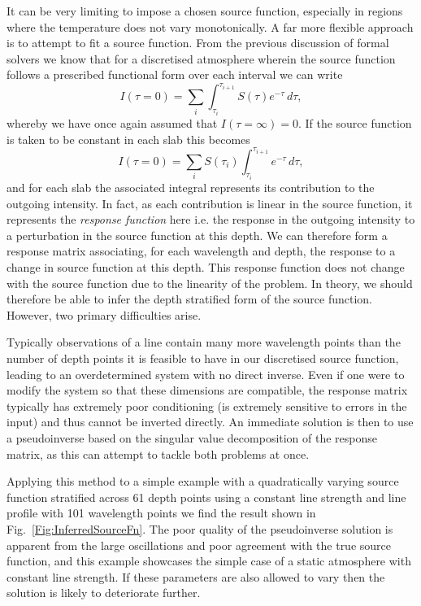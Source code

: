 It can be very limiting to impose a chosen source function, especially in regions where the temperature does not vary monotonically.
A far more flexible approach is to attempt to fit a source function.
From the previous discussion of formal solvers we know that for a discretised atmosphere wherein the source function follows a prescribed functional form over each interval we can write
\begin{equation}
    I(\tau=0) = \sum_i \int_{\tau_i}^{\tau_{i+1}} S(\tau)e^{-\tau}\, d\tau,
\end{equation}
whereby we have once again assumed that $I(\tau=\infty)=0$.
If the source function is taken to be constant in each slab this becomes
\begin{equation}\label{Eq:LinearResponse}
    I(\tau=0) = \sum_i S(\tau_i) \int_{\tau_i}^{\tau_{i+1}} e^{-\tau}\, d\tau,
\end{equation}
and for each slab the associated integral represents its contribution to the outgoing intensity.
In fact, as each contribution is linear in the source function, it represents the \emph{response function} here i.e. the response in the outgoing intensity to a perturbation in the source function at this depth.
We can therefore form a response matrix associating, for each wavelength and depth, the response to a change in source function at this depth.
This response function does not change with the source function due to the linearity of the problem.
In theory, we should therefore be able to infer the depth stratified form of the source function.
However, two primary difficulties arise.

Typically observations of a line contain many more wavelength points than the number of depth points it is feasible to have in our discretised source function, leading to an overdetermined system with no direct inverse.
Even if one were to modify the system so that these dimensions are compatible, the response matrix typically has extremely poor conditioning (is extremely sensitive to errors in the input) and thus cannot be inverted directly.
An immediate solution is then to use a pseudoinverse based on the singular value decomposition of the response matrix, as this can attempt to tackle both problems at once.

Applying this method to a simple example with a quadratically varying source function stratified across 61 depth points using a constant line strength and line profile with 101 wavelength points we find the result shown in Fig.~\ref{Fig:InferredSourceFn}.
The poor quality of the pseudoinverse solution is apparent from the large oscillations and poor agreement with the true source function, and this example showcases the simple case of a static atmosphere with constant line strength.
If these parameters are also allowed to vary then the solution is likely to deteriorate further.

